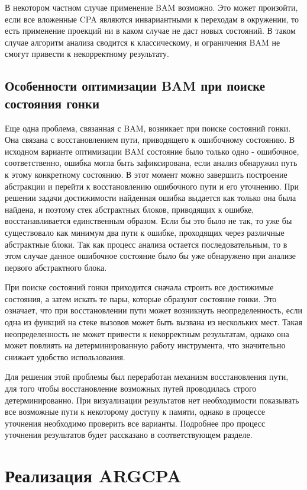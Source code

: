 В некотором частном случае применение BAM возможно. 
Это может произойти, если все вложенные CPA являются инвариантными к переходам в окружении, то есть применение проекций ни в каком случае не даст новых состояний.
В таком случае алгоритм анализа сводится к классическому, и ограничения BAM не смогут привести к некорректному результату.

\subsection{Особенности оптимизации BAM при поиске состояния гонки}

Еще одна проблема, связанная с BAM, возникает при поиске состояний гонки. Она связана с  восстановлением пути, приводящего к ошибочному состоянию.
В исходном варианте оптимизации BAM состояние было только одно - ошибочное, соответственно, ошибка могла быть зафиксирована, если анализ обнаружил путь к этому конкретному состоянию.
В этот момент можно завершить построение абстракции и перейти к восстановлению ошибочного пути и его уточнению.
При решении задачи достижимости найденная ошибка выдается как только она была найдена, и поэтому стек абстрактных блоков, приводящих к ошибке, восстанавливается единственным образом.
Если бы это было не так, то уже бы существовало как минимум два пути к ошибке, проходящих через различные абстрактные блоки.
Так как процесс анализа остается последовательным, то в этом случае данное ошибочное состояние было бы уже обнаружено при анализе первого абстрактного блока. 

При поиске состояний гонки приходится сначала строить все достижимые состояния, а затем искать те пары, которые образуют состояние гонки.
Это означает, что при восстановлении пути может возникнуть неопределенность, если одна из функций на стеке вызовов может быть вызвана из нескольких мест.
Такая неопределенность не может привести к некорректным результатам, однако она может повлиять на детерминированную работу инструмента, что значительно снижает удобство использования.

Для решения этой проблемы был переработан механизм восстановления пути, для того чтобы восстановление возможных путей проводилась строго детерминированно.
При визуализации результатов нет необходимости показывать все возможные пути к некоторому доступу к памяти, однако в процессе уточнения необходимо проверить все варианты.
Подробнее про процесс уточнения результатов будет рассказано в соответствующем разделе.

\section{Реализация ARGCPA}
\label{sect_impl_arg}

